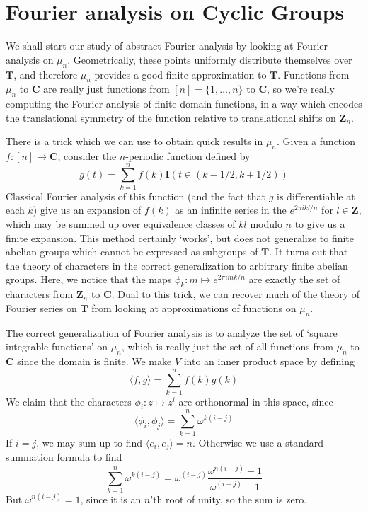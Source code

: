 \section{Fourier analysis on Cyclic Groups}

We shall start our study of abstract Fourier analysis by looking at Fourier analysis on $\mu_n$. Geometrically, these points uniformly distribute themselves over $\mathbf{T}$, and therefore $\mu_n$ provides a good finite approximation to $\mathbf{T}$. Functions from $\mu_n$ to $\mathbf{C}$ are really just functions from $[n] = \{ 1, \dots, n \}$ to $\mathbf{C}$, so we're really computing the Fourier analysis of finite domain functions, in a way which encodes the translational symmetry of the function relative to translational shifts on $\mathbf{Z}_n$.

There is a trick which we can use to obtain quick results in $\mu_n$. Given a function $f: [n] \to \mathbf{C}$, consider the $n$-periodic function defined by
%
\[ g(t) = \sum_{k = 1}^n f(k) \mathbf{I}\left( t \in (k-1/2,k+1/2) \right) \]
%
Classical Fourier analysis of this function (and the fact that $g$ is differentiable at each $k$) give us an expansion of $f(k)$ as an infinite series in the $e^{2\pi i k l/n}$ for $l \in \mathbf{Z}$, which may be summed up over equivalence classes of $kl$ modulo $n$ to give us a finite expansion. This method certainly `works', but does not generalize to finite abelian groups which cannot be expressed as subgroups of $\mathbf{T}$. It turns out that the theory of characters in the correct generalization to arbitrary finite abelian groups. Here, we notice that the maps $\phi_k: m \mapsto e^{2 \pi i mk/n}$ are exactly the set of characters from $\mathbf{Z}_n$ to $\mathbf{C}$. Dual to this trick, we can recover much of the theory of Fourier series on $\mathbf{T}$ from looking at approximations of functions on $\mu_n$.

The correct generalization of Fourier analysis is to analyze the set of `square integrable functions' on $\mu_n$, which is really just the set of all functions from $\mu_n$ to $\mathbf{C}$ since the domain is finite. We make $V$ into an inner product space by defining
%
\[ \langle f, g \rangle = \sum_{k = 1}^n f(k) \overline{g(k)} \]
%
We claim that the characters $\phi_i: z \mapsto z^i$ are orthonormal in this space, since
%
\[ \langle \phi_i, \phi_j \rangle = \sum_{k = 1}^n \omega^{k(i-j)} \]
%
If $i = j$, we may sum up to find $\langle e_i, e_j \rangle = n$. Otherwise we use a standard summation formula to find
%
\[ \sum_{k = 1}^n \omega^{k(i-j)} = \omega^{(i-j)} \frac{\omega^{n(i-j)} - 1}{\omega^{(i-j)} -1} \]
%
But $\omega^{n(i-j)} = 1$, since it is an $n$'th root of unity, so the sum is zero.

